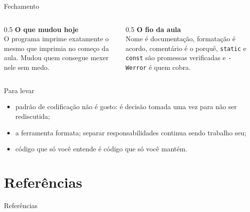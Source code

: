 \documentclass[aspectratio=169]{beamer}
\begin{document}
\begin{frame}{Fechamento}
  \begin{columns}[T]
    \begin{column}{0.5\textwidth}
      \textbf{O que mudou hoje}\\[0.3em]
      O programa imprime exatamente o mesmo que imprimia no começo da aula.
      Mudou quem consegue mexer nele sem medo.
    \end{column}
    \begin{column}{0.5\textwidth}
      \textbf{O fio da aula}\\[0.3em]
      Nome é documentação, formatação é acordo, comentário é o porquê,
      \texttt{static} e \texttt{const} são promessas verificadas e
      \texttt{-Werror} é quem cobra.
    \end{column}
  \end{columns}
  \begin{block}{Para levar}
    \begin{itemize}
      \item padrão de codificação não é gosto: é decisão tomada uma vez para
        não ser rediscutida;
      \item a ferramenta formata; separar responsabilidades continua sendo
        trabalho seu;
      \item código que só você entende é código que só você mantém.
    \end{itemize}
  \end{block}
\end{frame}

\section*{Referências}
\begin{frame}[allowframebreaks]{Referências}
  \nocite{*}
  
  
\end{frame}
\end{document}
